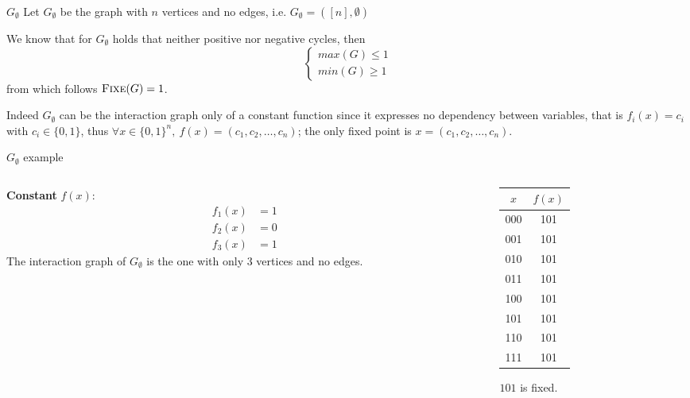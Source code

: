 \documentclass{beamer}
\begin{document}
\begin{frame}{$G_\emptyset$}
    \justifying
    Let $G_\emptyset$ be the graph with $n$ vertices and no edges, i.e. $G_\emptyset = ([n], \emptyset)$
    
    
    We know that for $G_\emptyset$ holds that neither positive nor negative cycles, then 
    \[
    \begin{cases}
        max(G) \leq 1\\
        min(G) \geq 1
    \end{cases}
    \]
    from which follows $\textsc{Fixe}(G) = 1$.
    
    
    Indeed $G_\emptyset$ can be the interaction graph only of a constant function since it expresses no dependency between variables, that is
    $f_i(x) = c_i$ with $c_i \in \{0,1\}$, thus $\forall x \in \{0,1\}^n,\ f(x) = (c_1, c_2, \dots, c_n)$; the only fixed point is $x = (c_1, c_2, \dots, c_n)$.
\end{frame}


\begin{frame}{$G_\emptyset$ example}
\justifying
    \begin{example}
        \vspace{-1em}
        \begin{columns}
            \begin{column}{0.4\textwidth}
                \justifying
                \textbf{Constant} $f(x)$:
                \begin{alignat*}{2}
                f_1(x) &= 1 \\
                f_2(x) &= 0 \\
                f_3(x) &= 1
                \end{alignat*}
                The interaction graph of $G_\emptyset$ is the one with only 3 vertices and no edges.
        	\end{column}
            \begin{column}{0.3\textwidth}
                \begin{table}
        		\begin{tabular}{c|c}
        		$x$ & $f(x)$ \\\hline
        		000 & 101 \\
        		001 & 101 \\
        		010 & 101 \\
        		011 & 101 \\
        		100 & 101 \\
        		101 & 101 \\
        		110 & 101 \\
        		111 & 101 \\
        		\end{tabular}
        		\end{table}
        		\centering
        		$101$ is fixed.
        	\end{column}
        \end{columns}
    \end{example}
\end{frame}
\end{document}

